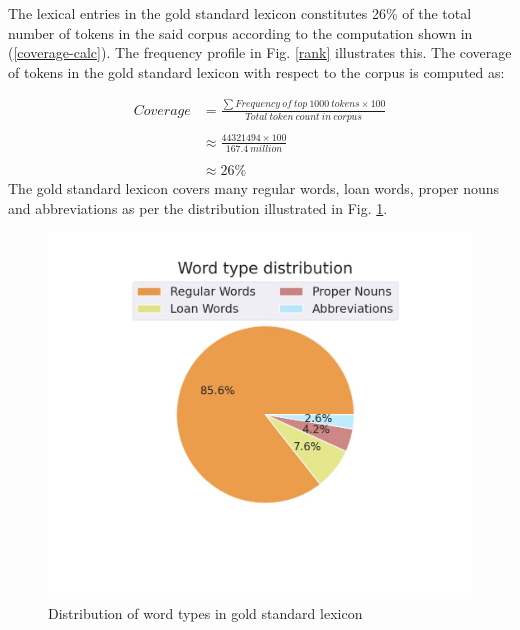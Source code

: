 \documentclass{ieeeaccess}
\begin{document}
The lexical entries in the gold standard lexicon constitutes  26\% of the total number of tokens in the said corpus according to the computation shown in (\ref{coverage-calc}). The frequency profile in Fig. \ref{rank} illustrates this. The coverage of tokens in the gold standard lexicon with respect to the corpus is computed as: 

\begin{equation}
\label{coverage-calc}
\begin{split}
Coverage & =\frac{\sum{}{}{Frequency\ of\ top\ 1000\ tokens} \times 100 }{Total\ token\ count\ in\ corpus}  \\ \\
&  \approx \frac{44321494 \times 100}{167.4\ million} \\ \\
& \approx 26 \%
\end{split}
\end{equation}
 The gold standard lexicon covers many regular words, loan words, proper nouns and abbreviations as per the distribution illustrated in Fig. \ref{pie-chart}. 



\begin{figure}[h]
    \centering
    \includegraphics[trim={3cm 8cm 3cm 0cm},clip=true, width=\linewidth]{wordtypes.jpg}
    \caption{Distribution of word types in gold standard lexicon}
    \label{pie-chart}
\end{figure}
\end{document}
